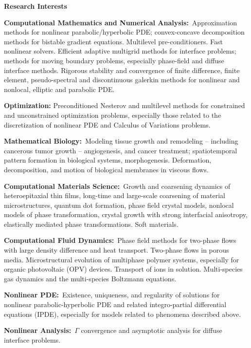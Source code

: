 \documentclass[11pt]{letter}
\begin{document}
{\LARGE\bf  Research Interests}
    \begin{description}
    \item
\textbf{Computational Mathematics and Numerical Analysis:}~Approximation methods for nonlinear parabolic/hyperbolic PDE; convex-concave decomposition methods for bistable gradient equations. Multilevel pre-conditioners. Fast nonlinear solvers. Efficient adaptive multigrid methods for interface problems; methods for moving boundary problems, especially phase-field and diffuse interface methods. Rigorous stability and convergence of finite difference, finite element, pseudo-spectral and discontinuous galerkin methods for nonlinear and nonlocal, elliptic and parabolic PDE.
	\item
\textbf{Optimization:} Preconditioned Nesterov and multilevel methods for constrained and unconstrained optimization problems, especially those related to the discretization of nonlinear PDE and Calculus of Variations problems.

	\item
\textbf{Mathematical Biology:}~Modeling tissue growth and remodeling -- including cancerous tumor growth -- angiogenesis, and cancer treatment; spatiotemporal pattern formation in biological systems, morphogenesis.  Deformation, decomposition, and motion of biological membranes in viscous flows.
	\item
\textbf{Computational Materials Science:}~Growth and coarsening dynamics of heteroepitaxial thin films, long-time and large-scale coarsening of material microstructures, quantum dot formation, phase field crystal models, nonlocal models of phase transformation, crystal growth with strong interfacial anisotropy, elastically mediated phase transformations. Soft materials.
	\item
\textbf{Computational Fluid Dynamics:}~Phase field methods for two-phase flows with large density difference and heat transport. Two-phase flows in porous media. Microstructural evolution of multiphase polymer systems, especially for organic photovoltaic (OPV) devices. Transport of ions in solution. Multi-species gas dynamics and the multi-species Boltzmann equations.
	\item
\textbf{Nonlinear PDE:}~Existence, uniqueness, and regularity of solutions for nonlinear parabolic-hyperbolic PDE and related integro-partial differential equations (IPDE), especially for models related to phenomena described above.
	\item
\textbf{Nonlinear Analysis:}~$\Gamma$ convergence and asymptotic analysis for diffuse interface problems.
    \end{description}
	
\end{document}
